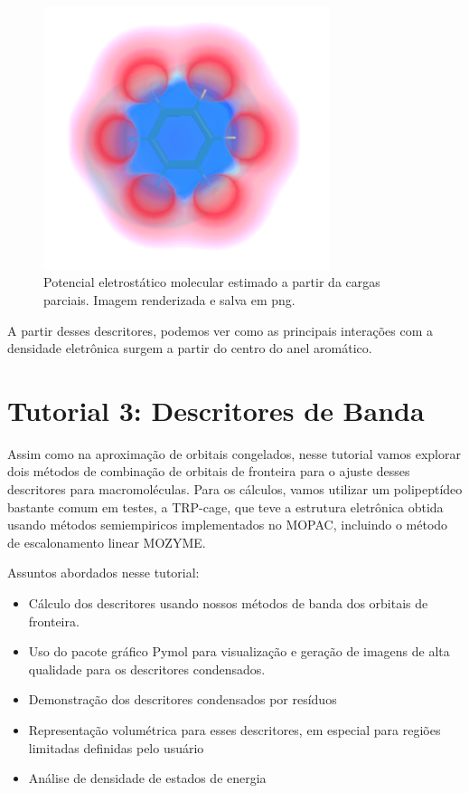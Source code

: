\documentclass[a4paper,11pt]{refart}
\begin{document}
\hspace*{-\leftmarginwidth}
\begin{minipage}{\fullwidth}
	\begin{figure}[H]
		\begin{center}
			\includegraphics[width=3.3in]{images/tut2_img12}
			\caption{Potencial eletrostático molecular estimado a partir da cargas parciais. Imagem renderizada e salva em png.}
			\label{fig_tut2_11}
		\end{center}
	\end{figure}
\end{minipage}

A partir desses descritores, podemos ver como as principais interações com a densidade eletrônica surgem a partir do centro do anel aromático. 

\newpage
\section{Tutorial 3: Descritores de Banda}

Assim como na aproximação de orbitais congelados, nesse tutorial vamos explorar dois métodos de combinação de orbitais de fronteira para o ajuste desses descritores para macromoléculas. Para os cálculos, vamos utilizar um polipeptídeo bastante comum em testes, a TRP-cage, que teve a estrutura eletrônica obtida usando métodos semiempiricos implementados no MOPAC, incluindo o método de escalonamento linear MOZYME.

Assuntos abordados nesse tutorial:

\begin{itemize}
	\item Cálculo dos descritores usando nossos métodos de banda dos orbitais de fronteira.
	\item Uso do pacote gráfico Pymol para visualização e geração de imagens de alta qualidade para os descritores condensados.
	\item Demonstração dos descritores condensados por resíduos
	\item Representação volumétrica para esses descritores, em especial para regiões limitadas definidas pelo usuário
	\item Análise de densidade de estados de energia
\end{itemize}
\end{document}
